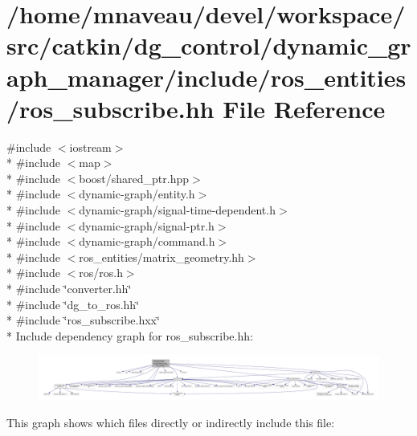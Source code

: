 \hypertarget{ros__subscribe_8hh}{}\section{/home/mnaveau/devel/workspace/src/catkin/dg\+\_\+control/dynamic\+\_\+graph\+\_\+manager/include/ros\+\_\+entities/ros\+\_\+subscribe.hh File Reference}
\label{ros__subscribe_8hh}
{\ttfamily \#include $<$iostream$>$}\\*
{\ttfamily \#include $<$map$>$}\\*
{\ttfamily \#include $<$boost/shared\+\_\+ptr.\+hpp$>$}\\*
{\ttfamily \#include $<$dynamic-\/graph/entity.\+h$>$}\\*
{\ttfamily \#include $<$dynamic-\/graph/signal-\/time-\/dependent.\+h$>$}\\*
{\ttfamily \#include $<$dynamic-\/graph/signal-\/ptr.\+h$>$}\\*
{\ttfamily \#include $<$dynamic-\/graph/command.\+h$>$}\\*
{\ttfamily \#include $<$ros\+\_\+entities/matrix\+\_\+geometry.\+hh$>$}\\*
{\ttfamily \#include $<$ros/ros.\+h$>$}\\*
{\ttfamily \#include \char`\"{}converter.\+hh\char`\"{}}\\*
{\ttfamily \#include \char`\"{}dg\+\_\+to\+\_\+ros.\+hh\char`\"{}}\\*
{\ttfamily \#include \char`\"{}ros\+\_\+subscribe.\+hxx\char`\"{}}\\*
Include dependency graph for ros\+\_\+subscribe.\+hh\+:\nopagebreak
\begin{figure}[H]
\begin{center}
\leavevmode
\includegraphics[width=350pt]{ros__subscribe_8hh__incl}
\end{center}
\end{figure}
This graph shows which files directly or indirectly include this file\+:\nopagebreak
